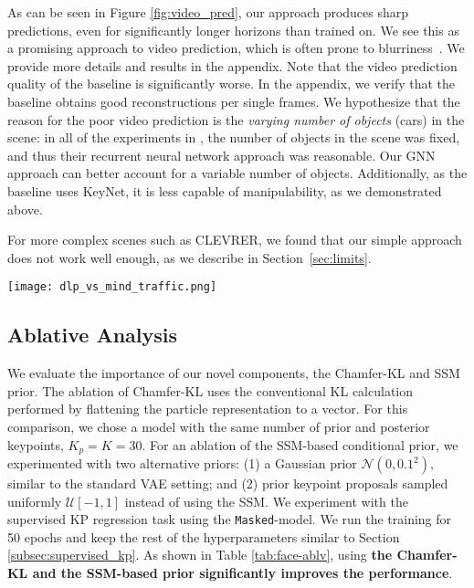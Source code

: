 \documentclass[nohyperref]{article}
\theoremstyle{plain}
\theoremstyle{definition}
\theoremstyle{remark}
\begin{document}
As can be seen in Figure \ref{fig:video_pred}, our approach produces sharp predictions, even for significantly longer horizons than trained on. 
We see this as a promising approach to video prediction, which is often prone to blurriness~\cite{lee2018savp, yan2021videogpt, hafner2020dreamer2}. We provide more details and results in the appendix. 
Note that the video prediction quality of the \citet{minderer2019unsupervised} baseline is significantly worse. In the appendix, we verify that the baseline obtains good reconstructions per single frames.
We hypothesize that the reason for the poor video prediction is the \textit{varying number of objects} (cars) in the scene: in all of the experiments in \citet{minderer2019unsupervised}, the number of objects in the scene was fixed, and thus their recurrent neural network approach was reasonable. Our GNN approach can better account for a variable number of objects. Additionally, as the baseline uses KeyNet, it is less capable of manipulability, as we demonstrated above.

For more complex scenes 
such as CLEVRER, we found that our simple approach does not work well enough, as we describe in Section~\ref{sec:limits}.

\begin{figure*}[h]
     \centering
     \texttt{[image: dlp\_vs\_mind\_traffic.png]}
        \caption{Video prediction on the Traffic dataset. We use the pre-trained \texttt{Object} model to provide the particle-representation and a GNN to predict the temporal change in particles. Top - ground truth, middle - \citet{minderer2019unsupervised} prediction, bottom - DLP (ours) prediction.}
        \label{fig:video_pred}
\end{figure*}

\subsection{Ablative Analysis}
\label{sec:ablation}
We evaluate the importance of our novel components, the Chamfer-KL and SSM prior. 
The ablation of Chamfer-KL uses the conventional KL calculation performed by flattening the particle representation to a vector. For this comparison, we chose a model with the same number of prior and posterior keypoints, $K_p=K=30$.
For an ablation of the SSM-based conditional prior, we experimented with two alternative priors: (1) a Gaussian prior $\mathcal{N}(0, 0.1^2)$, similar to the standard VAE setting; and (2) prior keypoint proposals sampled uniformly $\mathcal{U}[-1, 1]$ instead of using the SSM.
We experiment with the supervised KP regression task using the \texttt{Masked}-model.
We run the training for 50 epochs and keep the rest of the hyperparameters similar to Section \ref{subsec:supervised_kp}. As shown in Table \ref{tab:face-ablv}, using \textbf{the Chamfer-KL and the SSM-based prior significantly improves the performance}.
\end{document}
